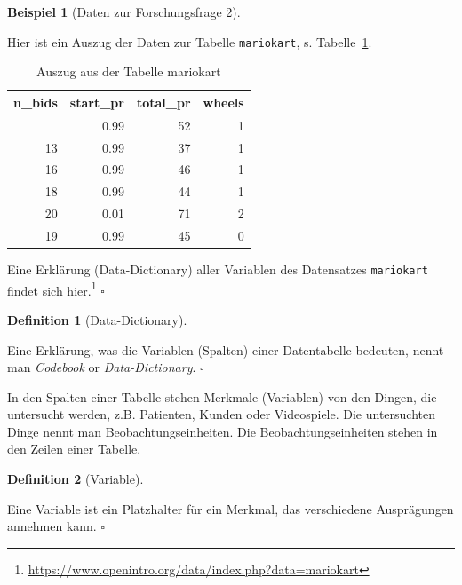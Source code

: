 \documentclass[
  letterpaper,
  twoside,
  open=any]{scrbook}
\theoremstyle{definition}
\theoremstyle{definition}
\newtheorem{example}{Beispiel}[chapter]
\theoremstyle{definition}
\newtheorem{definition}{Definition}[chapter]
\theoremstyle{remark}
\begin{document}
\begin{example}[Daten zur Forschungsfrage
2]\protect\hypertarget{exm-daten}{}\label{exm-daten}

Hier ist ein Auszug der Daten zur Tabelle \texttt{mariokart}, s.
Tabelle~\ref{tbl-mariokart}.

\begin{longtable}[]{@{}rrrr@{}}

\caption{\label{tbl-mariokart}Auszug aus der Tabelle mariokart}

\tabularnewline

\toprule\noalign{}
n\_bids & start\_pr & total\_pr & wheels \\
\midrule\noalign{}
\endhead
\bottomrule\noalign{}
\endlastfoot
20 & 0.99 & 52 & 1 \\
13 & 0.99 & 37 & 1 \\
16 & 0.99 & 46 & 1 \\
18 & 0.99 & 44 & 1 \\
20 & 0.01 & 71 & 2 \\
19 & 0.99 & 45 & 0 \\

\end{longtable}

Eine Erklärung (Data-Dictionary) aller Variablen des Datensatzes
\texttt{mariokart} findet sich
\href{https://www.openintro.org/data/index.php?data=mariokart}{hier}.\footnote{\url{https://www.openintro.org/data/index.php?data=mariokart}}
\(\square\)

\end{example}

\begin{definition}[Data-Dictionary]\protect\hypertarget{def-datadict}{}\label{def-datadict}

Eine Erklärung, was die Variablen (Spalten) einer Datentabelle bedeuten,
nennt man \emph{Codebook} or \emph{Data-Dictionary}. \(\square\)

\end{definition}

In den Spalten einer Tabelle stehen Merkmale (Variablen) von den Dingen,
die untersucht werden, z.B. Patienten, Kunden oder Videospiele. Die
untersuchten Dinge nennt man Beobachtungseinheiten. Die
Beobachtungseinheiten stehen in den Zeilen einer Tabelle.

\begin{definition}[Variable]\protect\hypertarget{def-var}{}\label{def-var}

Eine Variable ist ein Platzhalter für ein Merkmal, das verschiedene
Ausprägungen annehmen kann. \(\square\)

\end{definition}
\end{document}
